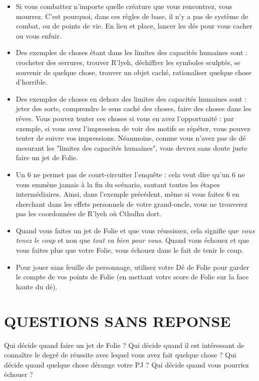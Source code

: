 \begin{itemize}
\item Si vous combattez n'importe quelle créature que vous rencontrez, vous mourrez. C'est pourquoi, dans ces règles de base, il n'y a pas de système de combat, ou de points de vie. En lieu et place, lancer les dés pour vous cacher ou vous enfuir.\\
\item Des exemples de choses étant dans les limites des capacités humaines sont : crocheter des serrures, trouver R'lyeh, déchiffrer les symboles sculptés, se souvenir de quelque chose, trouver un objet caché, rationaliser quelque chose d'horrible.\\
\item Des exemples de choses en dehors des limites des capacités humaines sont : jeter des sorts, comprendre le sens caché des choses, faire des choses dans les rêves. Vous pouvez tenter ces choses si vous en avez l'opportunité : par exemple, si vous avez l'impression de voir des motifs se répéter, vous pouvez tenter de suivre vos impressions. Néanmoins, comme vous n'avez pas de dé mesurant les "limites des capacités humaines", vous devrez sans doute juste faire un jet de Folie.\\
\item Un 6 ne permet pas de court-circuiter l'enquête : cela veut dire qu'un 6 ne vous emmène jamais à la fin du scénario, sautant toutes les étapes intermédiaires. Ainsi, dans l'exemple précédent, même si vous faites 6 en cherchant dans les effets personnels de votre grand-oncle, vous ne trouverez pas les coordonnées de R'lyeh où Cthulhu dort.\\
\item Quand vous faites un jet de Folie et que vous réussissez, cela signifie que \textit{vous tenez le coup} et non que \textit{tout va bien pour vous}. Quand vous échouez et que vous faites plus que votre Folie, vous échouez dans le fait de tenir le coup.\\
\item Pour jouer sans feuille de personnage, utilisez votre Dé de Folie pour garder le compte de vos points de Folie (en mettant votre score de Folie sur la face haute du dé).
\end{itemize}

\section{QUESTIONS SANS REPONSE}

Qui décide quand faire un jet de Folie ? Qui décide quand il est intéressant de connaître le degré de réussite avec lequel vous avez fait quelque chose ? Qui décide quand quelque chose dérange votre PJ ? Qui décide quand vous pourriez échouer ?

